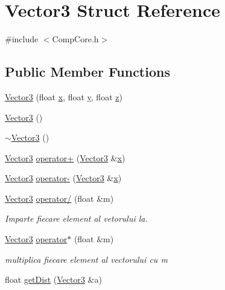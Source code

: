 \hypertarget{struct_vector3}{\section{Vector3 Struct Reference}
\label{struct_vector3}
}


{\ttfamily \#include $<$Comp\-Core.\-h$>$}

\subsection*{Public Member Functions}
\begin{DoxyCompactItemize}
\item 
\hyperlink{struct_vector3_ad53e22b52babdb90d423601f72467590}{Vector3} (float \hyperlink{struct_vector3_a7e2d3237b29a2f29d7b3d8b2934e35f2}{x}, float \hyperlink{struct_vector3_a86eb35a9fa2d5a49e7fad66a35fa9c13}{y}, float \hyperlink{struct_vector3_aa8c9461eb24bd2c364258078811a3e9d}{z})
\item 
\hyperlink{struct_vector3_a0f49191f7e001e7f7ae1cb49522118b4}{Vector3} ()
\item 
\hyperlink{struct_vector3_a5545e13e2e2861ece8f14b12a6a8101f}{$\sim$\-Vector3} ()
\item 
\hyperlink{struct_vector3}{Vector3} \hyperlink{struct_vector3_a6c1adee4e0d030153b6fd610897809c9}{operator+} (\hyperlink{struct_vector3}{Vector3} \&\hyperlink{struct_vector3_a7e2d3237b29a2f29d7b3d8b2934e35f2}{x})
\item 
\hyperlink{struct_vector3}{Vector3} \hyperlink{struct_vector3_a7ee2ab8be82ace8b8fca9e8dbb9d57af}{operator-\/} (\hyperlink{struct_vector3}{Vector3} \&\hyperlink{struct_vector3_a7e2d3237b29a2f29d7b3d8b2934e35f2}{x})
\item 
\hyperlink{struct_vector3}{Vector3} \hyperlink{struct_vector3_af70aac6ee8f570fcf6354288afcbba34}{operator/} (float \&m)
\begin{DoxyCompactList}\small\item\em Imparte fiecare element al vetorului la. \end{DoxyCompactList}\item 
\hyperlink{struct_vector3}{Vector3} \hyperlink{struct_vector3_a6e87944da5592f2649163d573873d758}{operator$\ast$} (float \&m)
\begin{DoxyCompactList}\small\item\em multiplica fiecare element al vectorului cu m \end{DoxyCompactList}\item 
float \hyperlink{struct_vector3_ac99f99d41cfbc35d7be65e0a7469ff79}{get\-Dist} (\hyperlink{struct_vector3}{Vector3} \&a)

\end{DoxyCompactItemize}
